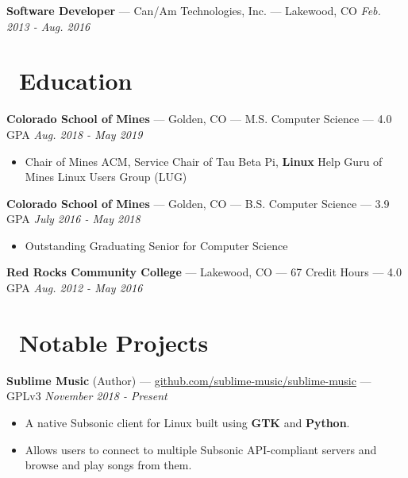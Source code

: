 \documentclass[10pt,letterpaper]{article}
\begin{document}
\vspace{2pt}
\textbf{Software Developer} --- Can/Am Technologies, Inc. --- Lakewood, CO
\hfill \textit{Feb. 2013 - Aug. 2016}

\section*{\faBook\ Education}
\textbf{Colorado School of Mines} --- Golden, CO --- M.S. Computer Science --- 4.0 GPA
\hfill \textit{Aug. 2018 - May 2019}
\begin{itemize}
    \item Chair of Mines ACM, Service Chair of Tau Beta Pi, \textbf{Linux} Help
        Guru of Mines Linux Users Group (LUG)
\end{itemize}

\textbf{Colorado School of Mines} --- Golden, CO --- B.S. Computer Science --- 3.9 GPA
\hfill \textit{July 2016 - May 2018}
\begin{itemize}
    \item Outstanding Graduating Senior for Computer Science
\end{itemize}

\textbf{Red Rocks Community College} --- Lakewood, CO --- 67 Credit Hours --- 4.0 GPA
\hfill \textit{Aug. 2012 - May 2016}

\section*{\faCode\ Notable Projects}
\textbf{Sublime Music} (Author) ---
\href{https://github.com/sublime-music/sublime-music}{github.com/sublime-music/sublime-music}
--- GPLv3 \hfill \textit{November 2018 - Present}
\begin{itemize}
    \item A native Subsonic client for Linux built using \textbf{GTK} and
        \textbf{Python}.
    \item Allows users to connect to multiple Subsonic API-compliant servers and
        browse and play songs from them.
\end{itemize}
\end{document}
